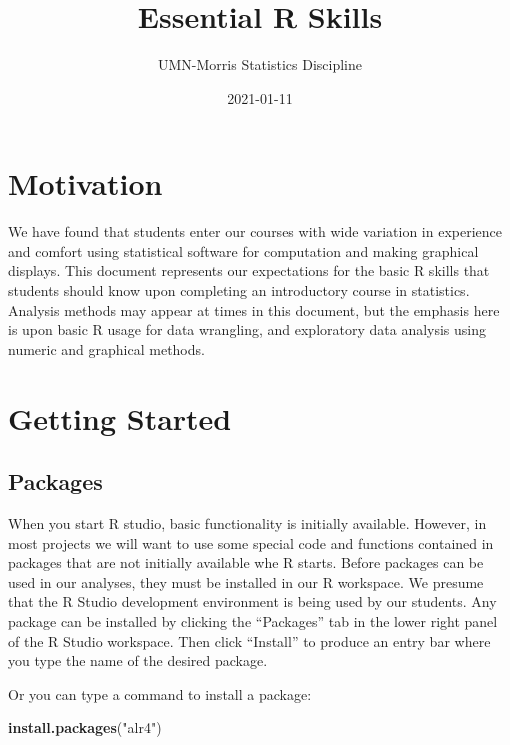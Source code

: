 \documentclass[
]{book}
\title{Essential R Skills}
\author{UMN-Morris Statistics Discipline}
\date{2021-01-11}
\newenvironment{Shaded}{\begin{snugshade}}{\end{snugshade}}
\newcommand{\KeywordTok}[1]{\textcolor[rgb]{0.13,0.29,0.53}{\textbf{#1}}}
\newcommand{\NormalTok}[1]{#1}
\newcommand{\StringTok}[1]{\textcolor[rgb]{0.31,0.60,0.02}{#1}}
\begin{document}
\maketitle

{
\setcounter{tocdepth}{1}
\tableofcontents
}
\hypertarget{motivation}{%
\chapter{Motivation}\label{motivation}}

We have found that students enter our courses with wide variation in experience and comfort using statistical software for computation and making graphical displays. This document represents our expectations for the basic R skills that students should know upon completing an introductory course in statistics. Analysis methods may appear at times in this document, but the emphasis here is upon basic R usage for data wrangling, and exploratory data analysis using numeric and graphical methods.

\hypertarget{GettingStarted}{%
\chapter{Getting Started}\label{GettingStarted}}

\hypertarget{packages}{%
\section{Packages}\label{packages}}

When you start R studio, basic functionality is initially available. However, in most projects we will want to use some special code and functions contained in packages that are not initially available whe R starts. Before packages can be used in our analyses, they must be installed in our R workspace. We presume that the R Studio development environment is being used by our students. Any package can be installed by clicking the ``Packages'' tab in the lower right panel of the R Studio workspace. Then click ``Install'' to produce an entry bar where you type the name of the desired package.

Or you can type a command to install a package:

\begin{Shaded}
\begin{Highlighting}[]
\KeywordTok{install.packages}\NormalTok{(}\StringTok{"alr4"}\NormalTok{)}
\end{Highlighting}
\end{Shaded}
\end{document}

